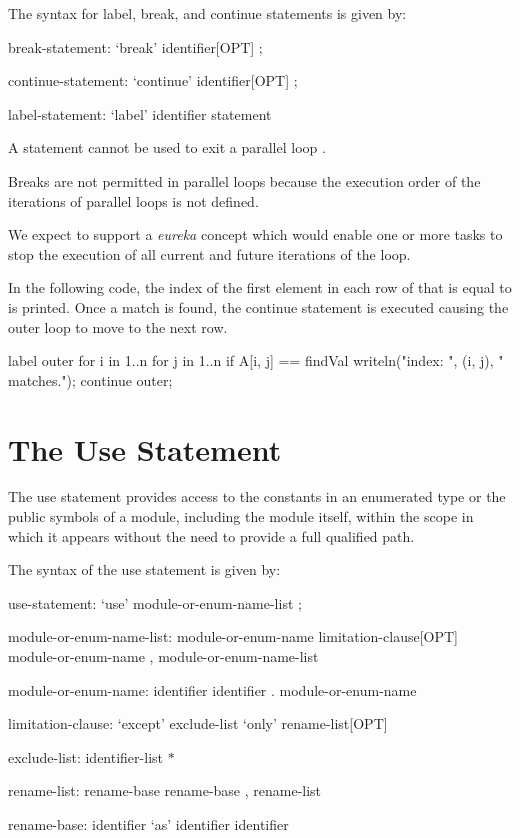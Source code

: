The syntax for label, break, and continue statements is given by:
\begin{syntax}
break-statement:
  `break' identifier[OPT] ;

continue-statement:
  `continue' identifier[OPT] ;

label-statement:
  `label' identifier statement
\end{syntax}

A  statement cannot be used to exit a parallel loop .

\begin{rationale}
Breaks are not permitted in parallel loops because the execution order
of the iterations of parallel loops is not defined.
\end{rationale}

\begin{future}
We expect to support a \emph{eureka} concept which would enable one or
more tasks to stop the execution of all current and future iterations
of the loop.
\end{future}

\begin{example}
In the following code, the index of the first element in each row of
 that is equal to  is printed.  Once a match is
found, the continue statement is executed causing the outer loop to
move to the next row.
\begin{chapel}
label outer for i in 1..n {
  for j in 1..n {
    if A[i, j] == findVal {
      writeln("index: ", (i, j), " matches.");
      continue outer;
    }
  }
}
\end{chapel}
\end{example}

\section{The Use Statement}
\label{The_Use_Statement}

The use statement provides access to the constants in an enumerated
type or the public symbols of a module, including the module itself,
within the scope in which it appears without the need to provide a
full qualified path.

The syntax of the use statement is given by:

\begin{syntax}
use-statement:
  `use' module-or-enum-name-list ;

module-or-enum-name-list:
  module-or-enum-name limitation-clause[OPT]
  module-or-enum-name , module-or-enum-name-list

module-or-enum-name:
  identifier
  identifier . module-or-enum-name

limitation-clause:
  `except' exclude-list
  `only' rename-list[OPT]

exclude-list:
  identifier-list
  $ * $

rename-list:
  rename-base
  rename-base , rename-list

rename-base:
  identifier `as' identifier
  identifier
\end{syntax}

